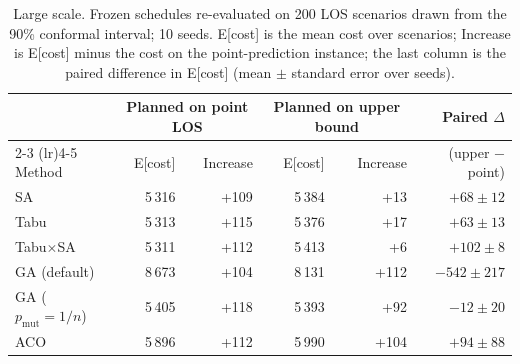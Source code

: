 \begin{table}[h]
\centering
\begin{tabular}{lrrrrr}
\toprule
 & \multicolumn{2}{c}{Planned on point LOS} & \multicolumn{2}{c}{Planned on upper bound} & Paired $\Delta$ \\
\cmidrule(lr){2-3} \cmidrule(lr){4-5}
Method & E[cost] & Increase & E[cost] & Increase & (upper $-$ point) \\
\midrule
SA & 5\,316 & +109 & 5\,384 & +13 & $+68 \pm 12$ \\
Tabu & 5\,313 & +115 & 5\,376 & +17 & $+63 \pm 13$ \\
Tabu$\times$SA & 5\,311 & +112 & 5\,413 & +6 & $+102 \pm 8$ \\
GA (default) & 8\,673 & +104 & 8\,131 & +112 & $-542 \pm 217$ \\
GA ($p_{\mathrm{mut}}=1/n$) & 5\,405 & +118 & 5\,393 & +92 & $-12 \pm 20$ \\
ACO & 5\,896 & +112 & 5\,990 & +104 & $+94 \pm 88$ \\
\bottomrule
\end{tabular}
\caption{Large scale. Frozen schedules re-evaluated on 200 LOS scenarios drawn from the 90\% conformal interval; 10 seeds. E[cost] is the mean cost over scenarios; Increase is E[cost] minus the cost on the point-prediction instance; the last column is the paired difference in E[cost] (mean $\pm$ standard error over seeds).}
\label{tab:robustness}
\end{table}
